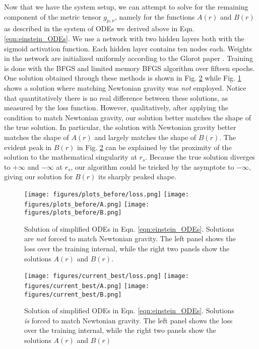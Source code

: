 \documentclass{CUP-JNL-DTM}%
\theoremstyle{definition}
\numberwithin{equation}{section}
\begin{document}
Now that we have the system setup, we can attempt to solve for the remaining component of the metric tensor $g_{\mu,\nu}$, namely for the functions $A(r)$ and $B(r)$ as described in the system of ODEs we derived above in Eqn. \ref{eqn:einstein_ODEs}. We use a network with two hidden layers both with the sigmoid activation function. Each hidden layer contains ten nodes each. Weights in the network are initialized uniformly according to the Glorot paper \cite{glorotUnderstandingDifficultyTraining2010}. Training is done with the BFGS and limited memory BFGS algorithm \cite{liuLimitedMemoryBFGS1989} over fifteen epochs. One solution obtained through these methods is shown in Fig. \ref{fig:best} while Fig. \ref{fig:before} shows a solution where matching Newtonian gravity was \emph{not} employed. Notice that quantitatively there is no real difference between these solutions, as measured by the loss function. However, qualitatively, after applying the condition to match Newtonian gravity, our solution better matches the shape of the true solution. In particular, the solution with Newtonian gravity better matches the shape of $A(r)$ and largely matches the shape of $B(r)$. The evident peak in $B(r)$ in Fig. \ref{fig:best} can be explained by the proximity of the solution to the mathematical singularity at $r_s$. Because the true solution diverges to $+\infty$ and $-\infty$ at $r_s$, our algorithm could be tricked by the asymptote to $-\infty$, giving our solution for $B(r)$ its sharply peaked shape. 

\begin{figure}
    \centering
    \texttt{[image: figures/plots\_before/loss.png]}
    \texttt{[image: figures/plots\_before/A.png]}
    \texttt{[image: figures/plots\_before/B.png]}
    \caption{Solution of simplified ODEs in Eqn. \ref{eqn:einstein_ODEs}. Solutions are \emph{not} forced to match Newtonian gravity. The left panel shows the loss over the training internal, while the right two panels show the solutions $A(r)$ and $B(r)$.}
    \label{fig:before}
\end{figure}

\begin{figure}
    \centering
    \texttt{[image: figures/current\_best/loss.png]}
    \texttt{[image: figures/current\_best/A.png]}
    \texttt{[image: figures/current\_best/B.png]}
    \caption{Solution of simplified ODEs in Eqn. \ref{eqn:einstein_ODEs}. Solutions \emph{is} forced to match Newtonian gravity. The left panel shows the loss over the training internal, while the right two panels show the solutions $A(r)$ and $B(r)$}
    \label{fig:best}
\end{figure}
\end{document}
